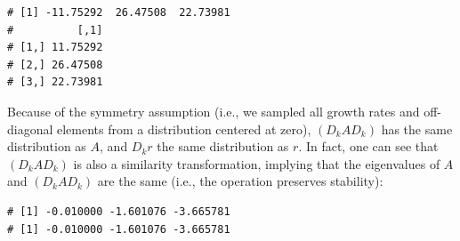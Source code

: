 \documentclass[
]{book}
\newenvironment{Shaded}{\begin{snugshade}}{\end{snugshade}}
\newcommand{\CommentTok}[1]{\textcolor[rgb]{0.56,0.35,0.01}{\textit{#1}}}
\newcommand{\DecValTok}[1]{\textcolor[rgb]{0.00,0.00,0.81}{#1}}
\newcommand{\KeywordTok}[1]{\textcolor[rgb]{0.13,0.29,0.53}{\textbf{#1}}}
\newcommand{\NormalTok}[1]{#1}
\newcommand{\OperatorTok}[1]{\textcolor[rgb]{0.81,0.36,0.00}{\textbf{#1}}}
\newcommand{\StringTok}[1]{\textcolor[rgb]{0.31,0.60,0.02}{#1}}
\begin{document}
\begin{Shaded}
\end{Shaded}

\begin{verbatim}
# [1] -11.75292  26.47508  22.73981
#          [,1]
# [1,] 11.75292
# [2,] 26.47508
# [3,] 22.73981
\end{verbatim}

Because of the symmetry assumption (i.e., we sampled all growth rates and off-diagonal elements from a distribution centered at zero), \((D_k A D_k)\) has the same distribution as \(A\), and \(D_k r\) the same distribution as \(r\). In fact, one can see that \((D_k A D_k)\) is also a similarity transformation, implying that the eigenvalues of \(A\) and \((D_k A D_k)\) are the same (i.e., the operation preserves stability):

\begin{Shaded}
\end{Shaded}

\begin{verbatim}
# [1] -0.010000 -1.601076 -3.665781
# [1] -0.010000 -1.601076 -3.665781
\end{verbatim}
\end{document}
